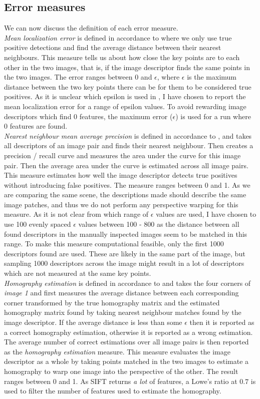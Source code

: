 \subsection{Error measures}
We can now discuss the definition of each error measure.\\
\textit{Mean localization error} is defined in accordance to \cite{sp} where we only use true positive detections and find the average distance between their nearest neighbours. This measure tells us about how close the key points are to each other in the two images, that is, if the image descriptor finds the same points in the two images. The error ranges between 0 and $\epsilon$, where $\epsilon$ is the maximum distance between the two key points there can be for them to be considered true positives. As it is unclear which epsilon is used in \cite{sp}, I have chosen to report the mean localization error for a range of epsilon values. To avoid rewarding image descriptors which find 0 features, the maximum error ($\epsilon$) is used for a run where 0 features are found.\\
\textit{Nearest neighbour mean average precision} is defined in accordance to \cite{sp}, and takes all descriptors of an image pair and finds their nearest neighbour. Then creates a precision / recall curve and measures the area under the curve for this image pair. Then the average area under the curve is estimated across all image pairs. This measure estimates how well the image descriptor detects true positives without introducing false positives. The measure ranges between 0 and 1. As we are comparing the same scene, the descriptions made should describe the same image patches, and thus we do not perform any perspective warping for this measure. As it is not clear from \cite{sp} which range of $\epsilon$ values are used, I have chosen to use 100 evenly spaced $\epsilon$ values between 100 - 800 as the distance between all found descriptors in the manually inspected images seem to be matched in this range. To make this measure computational feasible, only the first 1000 descriptors found are used. These are likely in the same part of the image, but sampling 1000 descriptors across the image might result in a lot of descriptors which are not measured at the same key points.\\
\textit{Homography estimation} is defined in accordance to \cite{sp} and takes the four corners of \textit{image 1} and first measures the average distance between each corresponding corner transformed by the true homography matrix and the estimated homography matrix found by taking nearest neighbour matches found by the image descriptor. If the average distance is less than some $\epsilon$ then it is reported as a correct homography estimation, otherwise it is reported as a wrong estimation. The average number of correct estimations over all image pairs is then reported as the \textit{homography estimation} measure. This measure evaluates the image descriptor as a whole by taking points matched in the two images to estimate a homography to warp one image into the perspective of the other. The result ranges between 0 and 1. As SIFT returns \textit{a lot} of features, a Lowe's ratio at $0.7$ is used to filter the number of features used to estimate the homography.